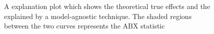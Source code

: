 \begin{figure}[ht!]
\centering
\caption{\textmd{A explanation plot which shows the theoretical true effects and the explained by a model-agnostic technique.  The shaded regions between the two curves represents the ABX statistic}}
\label{fig:area_example}
\par\medskip\ABNTEXfontereduzida\selectfont%
\par\medskip
\end{figure}




